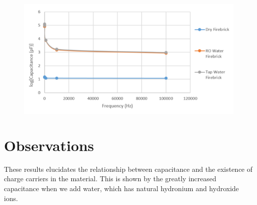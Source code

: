 \documentclass{article}
\begin{document}
\begin{figure}[h!]
\centering
\includegraphics[scale=0.8]{fire.png}
\end{figure}

\section{Observations}

These results elucidates the relationship between capacitance and the existence of charge carriers in the material. This is shown by the greatly increased capacitance when we add water, which has natural hydronium and hydroxide ions.
\end{document}
